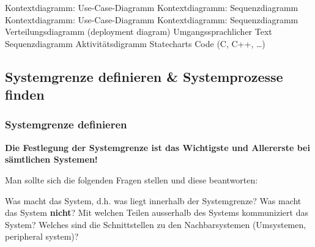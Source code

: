 \begin{minipage}[c]{0.6\columnwidth}
    \begingroup
    \renewcommand{\outlinei}{enumerate}
    \renewcommand{\outlineii}{itemize}

    \begin{outline}
        \1  
            \2 Kontextdiagramm: Use-Case-Diagramm
            \2 Kontextdiagramm: Sequenzdiagramm
        \1 
            \2 Kontextdiagramm: Use-Case-Diagramm
            \2 Kontextdiagramm: Sequenzdiagramm
        \1 
            \2 Verteilungsdiagramm (deployment diagram)
        \1 
            \2 Umgangssprachlicher Text
            \2 Sequenzdiagramm
            \2 Aktivitätsdigramm
            \2 Statecharts
            \2 Code (C, C++, \ldots)
    \end{outline}
    \endgroup
\end{minipage}
\hfill
\begin{minipage}[c]{0.38\columnwidth}
    \raggedright
    
    \vspace{0.2cm}

\end{minipage}


\subsection{Systemgrenze definieren \& Systemprozesse finden}

\subsubsection{Systemgrenze definieren}

\textbf{Die Festlegung der Systemgrenze ist das Wichtigste und Allererste bei sämtlichen Systemen!}

Man sollte sich die folgenden Fragen stellen und diese beantworten:

\vspace{0.1cm}

\begin{outline}
    \1 Was macht das System, d.h. was liegt innerhalb der Systemgrenze?
        \2 Was macht das System  \textbf{nicht}?
    \1 Mit welchen Teilen ausserhalb des Systems kommuniziert das System?
    \1 Welches sind die Schnittstellen zu den Nachbarsystemen (Umsystemen, peripheral system)?
\end{outline}


